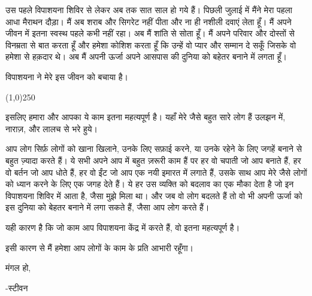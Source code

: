 \documentclass{article}
\begin{document}
उस पहले विपाशयना शिविर से लेकर अब तक सात साल हो गये हैं। पिछली जुलाई में मैंने मेरा पहला आधा मैराथन
दौड़ा। मैं अब शराब और सिगरेट नहीं पीता और ना ही नशीली दवाएं लेता हूँ। मैं अपने जीवन में इतना स्वस्थ पहले
कभी नहीं रहा। अब मैं शांति से सोता हूँ। मैं अपने परिवार और दोस्तों से विनम्रता से बात करता हूँ और हमेशा
कोशिश करता हूँ कि उन्हें वो प्यार और सम्मान दे सकूँ जिसके वो हमेशा से हक़दार थे। अब मैं अपनी ऊर्जा अपने
आसपास की दुनिया को बहेतर बनाने में लगता हूँ।

विपाशयना ने मेरे इस जीवन को बचाया है।

\begin{center}
\line(1,0){250}
\end{center}

इसलिए हमारा और आपका ये काम इतना महत्यपूर्ण है। यहाँ मेरे जैसे बहुत सारे लोग हैं \textemdash  उलझन में, नाराज़, और लालच से भरे हुये।

आप लोग सिर्फ़ लोगों को खाना खिलाने, उनके लिए सफ़ाई करने, या उनके रहेने के लिए जगहें बनाने से बहुत
ज़्यादा करते हैं। ये सभी अपने आप में बहुत ज़रूरी काम हैं पर हर वो चपाती जो आप बनाते हैं, हर वो बर्तन जो आप धोते हैं, हर वो ईंट जो आप एक नयी इमारत में लगाते हैं, उसके साथ आप मेरे जैसे लोगों को ध्यान करने के लिए एक जगह देते हैं।
ये हर उस व्यक्ति को बदलाव का एक मौका देता है जो इन विपाशयना शिविर में
आता है, जैसा मुझे मिला था। और जब वो लोग बदलते हैं तो वो भी अपनी ऊर्जा को इस दुनिया को बेहतर
बनाने में लगा सकते हैं, जैसा आप लोग करते हैं।

यही कारण है कि जो काम आप विपाशयना केंद्र में करते हैं, वो इतना महत्यपूर्ण है।

इसी कारण से मैं हमेशा आप लोगों के काम के प्रति आभारी रहूँगा।

मंगल हो,

-स्टीवन
\end{document}
